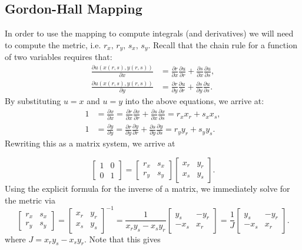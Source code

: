 \documentclass{article}
\newcommand{\pdiff}[2]{\frac{\partial {#1}}{\partial {#2}}}
\begin{document}
\subsection{Gordon-Hall Mapping}
\noindent In order to use the mapping to compute integrals (and derivatives) we will need to compute the metric, i.e. $r_x, \, r_y, \, s_x, \, s_y$. Recall that the chain rule for a function of two variables requires that:
  \begin{align*}
    \pdiff{u(x(r,s),y(r,s))}{x} & = \pdiff{r}{x}\pdiff{u}{r} + \pdiff{s}{x} \pdiff{u}{s}, \\
    \pdiff{u(x(r,s),y(r,s))}{y} & = \pdiff{r}{y}\pdiff{u}{r} + \pdiff{s}{y} \pdiff{u}{s}.
  \end{align*}
By substituting $u = x$ and $u = y$ into the above equations, we arrive at:
  \begin{align*}
    1 & = \pdiff{x}{x} = \pdiff{r}{x}\pdiff{x}{r} + \pdiff{s}{x} \pdiff{x}{s} = r_x x_r + s_x x_s, \\
    1 & = \pdiff{y}{y}  = \pdiff{r}{y}\pdiff{y}{r} + \pdiff{s}{y} \pdiff{y}{s} = r_y y_r + s_y y_s.  
  \end{align*}
Rewriting this as a matrix system, we arrive at 

  \begin{equation}
    \begin{bmatrix}
      1 & 0 \\
      0 & 1
    \end{bmatrix}
    = 
    \begin{bmatrix}
      r_x & s_x \\
      r_y & s_y
    \end{bmatrix}
    \begin{bmatrix}
      x_r & y_r \\
      x_s & y_s
    \end{bmatrix}.
  \end{equation}
Using the explicit formula for the inverse of a matrix, we immediately solve for the metric via
  \begin{equation}
    \begin{bmatrix}
      r_x & s_x \\
      r_y & s_y
    \end{bmatrix}
    =
    \begin{bmatrix}
      x_r & y_r \\
      x_s & y_s
    \end{bmatrix}^{-1}
    = \frac{1}{x_r y_s - x_s y_r}
    \begin{bmatrix}
      y_s & -y_r \\
      -x_s & x_r
    \end{bmatrix}
    = \frac{1}{J}
    \begin{bmatrix}
      y_s & -y_r \\
      -x_s & x_r
    \end{bmatrix}.
  \end{equation}
where $J = x_r y_s - x_s y_r$. Note that this gives
\end{document}
